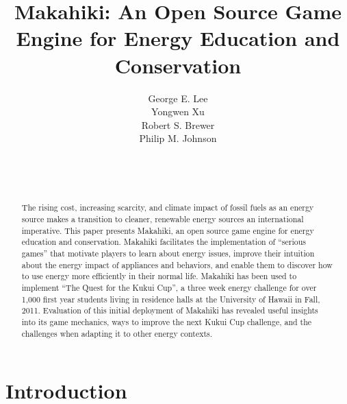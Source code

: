 \documentclass{acm_proc_article-sp}
\begin{document}
\title{Makahiki: An Open Source Game Engine for Energy Education and Conservation}


\author{
\smallskip
George E. Lee\\ 
\smallskip
Yongwen Xu\\ 
\smallskip
Robert S. Brewer\\ 
\smallskip
Philip M. Johnson\\
       \\
       \\
       \\
}

\maketitle
\begin{abstract}
  The rising cost, increasing scarcity, and climate impact of fossil
  fuels as an energy source makes a transition to cleaner, renewable energy
  sources an international imperative.  This paper presents Makahiki, an
  open source game engine for energy education and conservation.  Makahiki
  facilitates the implementation of ``serious games'' that motivate players
  to learn about energy issues, improve their intuition about the energy
  impact of appliances and behaviors, and enable them to discover how to
  use energy more efficiently in their normal life.  Makahiki has been
  used to implement ``The Quest for the Kukui Cup'', a three week energy
  challenge for over 1,000 first year students living in residence halls at
  the University of Hawaii in Fall, 2011.   Evaluation of this initial
  deployment of Makahiki has revealed useful insights into its game
  mechanics, ways to improve the next Kukui Cup challenge, and the
  challenges when adapting it to other energy contexts.
\end{abstract}




\section{Introduction}
\end{document}
